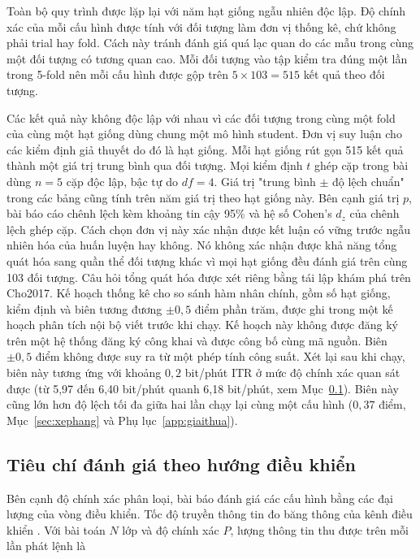 Toàn bộ quy trình được lặp lại với năm hạt giống ngẫu nhiên độc lập. Độ chính xác của mỗi cấu hình được tính với đối tượng làm đơn vị thống kê,
chứ không phải trial hay fold. Cách này tránh đánh giá quá lạc quan do các
mẫu trong cùng một đối tượng có tương quan cao. Mỗi đối tượng vào tập kiểm tra đúng một lần
trong 5-fold nên mỗi cấu hình được gộp trên $5 \times 103 = 515$ kết quả
theo đối tượng.

Các kết quả này không độc lập với nhau vì các đối tượng trong cùng một fold
của cùng một hạt giống dùng chung một mô hình student. Đơn vị suy luận cho
các kiểm định giả thuyết do đó là hạt giống. Mỗi hạt giống rút gọn 515 kết
quả thành một giá trị trung bình qua đối tượng. Mọi kiểm định $t$ ghép cặp
trong bài dùng $n = 5$ cặp độc lập, bậc tự do $df = 4$. Giá trị "trung
bình $\pm$ độ lệch chuẩn" trong các bảng cũng tính trên năm giá trị theo
hạt giống này. Bên cạnh giá trị $p$, bài báo cáo chênh lệch kèm khoảng tin
cậy 95\% và hệ số Cohen's $d_z$ của chênh lệch ghép cặp. Cách chọn đơn vị
này xác nhận được kết luận có vững trước ngẫu nhiên hóa của huấn luyện hay
không. Nó không xác nhận được khả năng tổng quát hóa sang quần thể đối
tượng khác vì mọi hạt giống đều đánh giá trên cùng 103 đối tượng. Câu hỏi
tổng quát hóa được xét riêng bằng tái lập khám phá trên Cho2017. Kế hoạch
thống kê cho so sánh hàm nhân chính, gồm số hạt giống, kiểm định và biên
tương đương $\pm 0{,}5$ điểm phần trăm, được ghi trong một kế hoạch phân
tích nội bộ viết trước khi chạy. Kế hoạch này không được đăng ký trên một
hệ thống đăng ký công khai và được công bố cùng mã nguồn. Biên $\pm 0{,}5$
điểm không được suy ra từ một phép tính công suất. Xét lại sau khi chạy,
biên này tương ứng với khoảng $0{,}2$ bit/phút ITR ở mức độ chính xác quan
sát được (từ 5,97 đến 6,40 bit/phút quanh 6,18 bit/phút, xem Mục~\ref{sec:rangbuoc}). Biên này cũng lớn hơn độ lệch tối đa giữa hai lần chạy lại
cùng một cấu hình ($0{,}37$ điểm, Mục~\ref{sec:xephang} và
Phụ lục~\ref{app:giaithua}).

\subsection{Tiêu chí đánh giá theo hướng điều khiển}
\label{sec:rangbuoc}

Bên cạnh độ chính xác phân loại, bài báo đánh giá các cấu hình bằng các
đại lượng của vòng điều khiển. Tốc độ truyền thông tin đo băng thông của
kênh điều khiển \cite{wolpaw2002brain}. Với bài toán $N$ lớp và độ chính
xác $P$, lượng thông tin thu được trên mỗi lần phát lệnh là

